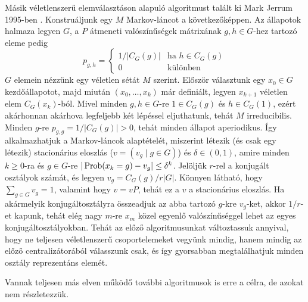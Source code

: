 Másik véletlenszerű elemválasztáson alapuló algoritmust talált ki Mark Jerrum 1995-ben \cite{Jer95}.
Konstruáljunk egy $M$ Markov-láncot a következőképpen.
Az állapotok halmaza legyen $G$, a $P$ átmeneti valószínűségek mátrixának $g, h \in G$-hez tartozó eleme pedig
\begin{equation*}
p_{g,h} =
\begin{cases}
1/|C_G(g)| & \text{ha $h \in C_G(g)$}\\
0 & \text{különben}
\end{cases}
\end{equation*}
$G$ elemein nézzünk egy véletlen sétát $M$ szerint. Először választunk egy $x_0 \in G$ kezdőállapotot, majd miután $(x_0, \dots, x_k)$ már definiált, legyen
$x_{k+1}$ véletlen elem $C_G(x_k)$-ból.
Mivel minden $g,h \in G$-re $1 \in C_G(g)$ és $h \in C_G(1)$, ezért akárhonnan akárhova legfeljebb két lépéssel eljuthatunk, tehát $M$ irreducibilis.
Minden $g$-re $p_{g,g} = 1/|C_G(g)| > 0$, tehát minden állapot aperiodikus.
Így alkalmazhatjuk a Markov-láncok alaptételét, miszerint létezik (és csak egy létezik) stacionárius eloszlás ($v = (v_g \mid g \in G)$) és $\delta \in (0,1)$, amire
minden $k \ge 0$-ra és $g \in G$-re $|\operatorname{Prob}(x_k = g) - v_g| \le \delta^k$.
Jelöljük $r$-rel a konjugált osztályok számát, és legyen $v_g = C_G(g)/r|G|$.
Könnyen látható, hogy $\sum_{g\in G} v_g = 1$, valamint hogy $v = vP$, tehát ez a $v$ a stacionárius eloszlás.
Ha akármelyik konjugáltosztályra összeadjuk az abba tartozó $g$-kre $v_g$-ket, akkor $1/r$-et kapunk, tehát elég nagy $m$-re $x_m$ közel egyenlő valószínűséggel lehet az egyes konjugáltosztályokban.
Tehát az előző algoritmusunkat változtassuk annyival, hogy ne teljesen véletlenszerű csoportelemeket vegyünk mindig, hanem mindig az előző centralizátorából válasszunk csak, és így gyorsabban megtalálhatjuk
minden osztály reprezentáns elemét.

Vannak teljesen más elven működő további algoritmusok is erre a célra, de azokat nem részletezzük.